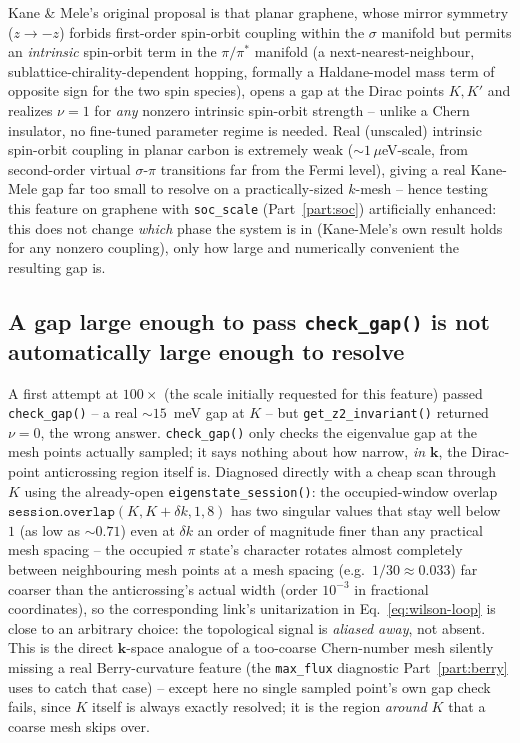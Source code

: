\documentclass[11pt]{article}
\begin{document}
Kane \& Mele's original proposal \cite{kanemele2005} is that planar graphene, whose
mirror symmetry ($z\to-z$) forbids first-order spin-orbit coupling within the $\sigma$
manifold but permits an \emph{intrinsic} spin-orbit term in the $\pi/\pi^*$ manifold
(a next-nearest-neighbour, sublattice-chirality-dependent hopping, formally a
Haldane-model mass term \cite{haldane1988} of opposite sign for the two spin species),
opens a gap at the Dirac points $K,K'$ and realizes $\nu=1$ for \emph{any} nonzero
intrinsic spin-orbit strength -- unlike a Chern insulator, no fine-tuned parameter
regime is needed. Real (unscaled) intrinsic spin-orbit coupling in planar carbon is
extremely weak ($\sim 1\,\mu$eV-scale, from second-order virtual $\sigma$-$\pi$
transitions far from the Fermi level), giving a real Kane-Mele gap far too small to
resolve on a practically-sized $k$-mesh -- hence testing this feature on graphene with
\texttt{soc\_scale} (Part~\ref{part:soc}) artificially enhanced: this does not change
\emph{which} phase the system is in (Kane-Mele's own result holds for any nonzero
coupling), only how large and numerically convenient the resulting gap is.

\subsection{A gap large enough to pass \texorpdfstring{\texttt{check\_gap()}}{check\_gap()} is not automatically large enough to resolve}

A first attempt at $100\times$ (the scale initially requested for this feature) passed
\texttt{check\_gap()} -- a real $\sim15$~meV gap at $K$ -- but \texttt{get\_z2\_invariant()}
returned $\nu=0$, the wrong answer. \texttt{check\_gap()} only checks the eigenvalue gap
at the mesh points actually sampled; it says nothing about how narrow, \emph{in
$\mathbf k$}, the Dirac-point anticrossing region itself is. Diagnosed directly with a
cheap scan through $K$ using the already-open \texttt{eigenstate\_session()}: the
occupied-window overlap $\texttt{session.overlap}(K,K{+}\delta k,1,8)$ has two singular
values that stay well below $1$ (as low as $\sim0.71$) even at $\delta k$ an order of
magnitude finer than any practical mesh spacing -- the occupied $\pi$ state's character
rotates almost completely between neighbouring mesh points at a mesh spacing (e.g.\
$1/30\approx0.033$) far coarser than the anticrossing's actual width (order $10^{-3}$ in
fractional coordinates), so the corresponding link's unitarization in
Eq.~\eqref{eq:wilson-loop} is close to an arbitrary choice: the topological signal is
\emph{aliased away}, not absent. This is the direct $\mathbf k$-space analogue of a
too-coarse Chern-number mesh silently missing a real Berry-curvature feature (the
\texttt{max\_flux} diagnostic Part~\ref{part:berry} uses to catch that case) -- except
here no single sampled point's own gap check fails, since $K$ itself is always exactly
resolved; it is the region \emph{around} $K$ that a coarse mesh skips over.
\end{document}
